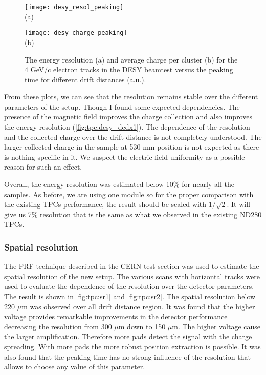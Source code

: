 \documentclass[../main.tex]{subfiles}
\begin{document}
\begin{figure}[!ht]
  \centering
  \begin{minipage}{0.49\linewidth}
    \centering
    \texttt{[image: desy\_resol\_peaking]} \\ (a)
  \end{minipage}
  \begin{minipage}{0.49\linewidth}
    \centering
    \texttt{[image: desy\_charge\_peaking]} \\ (b)
  \end{minipage}
  \caption{The energy resolution (a) and average charge per cluster (b) for the 4 GeV/c electron tracks in the DESY beamtest versus the peaking time for different drift distances (a.u.).}
  \label{fig:tpc:desy_dedx4}
\end{figure}

From these plots, we can see that the resolution remains stable over the different parameters of the setup. Though I found some expected dependencies. The presence of the magnetic field improves the charge collection and also improves the energy resolution (\autoref{fig:tpc:desy_dedx1}). The dependence of the resolution and the collected charge over the drift distance is not completely understood. The larger collected charge in the sample at 530 mm position is not expected as there is nothing specific in it. We suspect the electric field uniformity as a possible reason for such an effect.

Overall, the energy resolution was estimated below 10\% for nearly all the samples. As before, we are using one module so for the proper comparison with the existing TPCs performance, the result should be scaled with $1/\sqrt{2}$. It will give us 7\% resolution that is the same as what we observed in the existing ND280 TPCs.

\subsubsection{Spatial resolution}
The PRF technique described in the CERN test section was used to estimate the spatial resolution of the new setup. The various scans with horizontal tracks were used to evaluate the dependence of the resolution over the detector parameters. The result is shown in \autoref{fig:tpc:sr1} and \autoref{fig:tpc:sr2}. The spatial resolution below 220 $\mu$m was observed over all drift distance region. It was found that the higher voltage provides remarkable improvements in the detector performance decreasing the resolution from 300 $\mu$m down to 150 $\mu$m. The higher voltage cause the larger amplification. Therefore more pads detect the signal with the charge spreading. With more pads the more robust position extraction is possible. It was also found that the peaking time has no strong influence of the resolution that allows to choose any value of this parameter.
\end{document}
